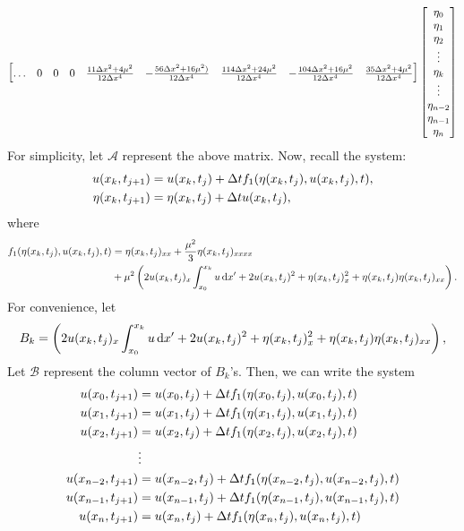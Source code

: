 \documentclass[10pt,reqno,oneside,a4paper]{article}
\begin{document}
\begin{align*}
\begin{bmatrix}
\ldots & 0 & 0 & 0 & \frac{11\Delta x^2 + 4 \mu^2}{12\Delta x^4} & - \frac{56 \Delta x^2 +16\mu^2)}{12\Delta x^4} & \frac{114\Delta x^2 + 24 \mu^2}{12\Delta x^4} &- \frac{104\Delta x^2 +16 \mu^2}{12\Delta x^4} & \frac{35 \Delta x^2 + 4\mu^2}{12\Delta x^4} 
\end{bmatrix}
\begin{bmatrix}
\eta_0 \\
\eta_1 \\
\eta_2 \\
\vdots \\
\eta_k \\
\vdots \\
\eta_{n-2} \\
\eta_{n-1} \\
\eta_{n}
\end{bmatrix}
\end{align*}
For simplicity, let $\mathcal{A}$ represent the above matrix. Now, recall the system:
\begin{align*}
u(x_k, t_{j+1}) &= u(x_k, t_j) + \Delta t f_1(\eta(x_k, t_j), u(x_k, t_j), t), \\
\eta(x_k, t_{j+1}) &=  \eta(x_k, t_j)+ \Delta t u(x_k, t_j),
\end{align*}
where 
\begin{align*}
f_1(\eta(x_k, t_j), u(x_k, t_j), t) &= \eta(x_k, t_j)_{xx} + \frac{\mu^2}{3} \eta(x_k, t_j)_{xxxx} \\
&+ \mu^2 \left( 2 u(x_k, t_j)_{x} \int^{x_k}_{x_0} u \,\mathrm{d} x' +2 u(x_k, t_j)^2 + \eta(x_k, t_j)^2_x + \eta(x_k, t_j)\eta(x_k, t_j)_{xx} \right).
\end{align*}
For convenience, let 
\[ B_k = \left( 2 u(x_k, t_j)_{x} \int^{x_k}_{x_0} u \,\mathrm{d} x' +2 u(x_k, t_j)^2 + \eta(x_k, t_j)^2_x + \eta(x_k, t_j)\eta(x_k, t_j)_{xx} \right), 
\]
Let $\mathcal{B}$ represent the column vector of $B_k$'s. Then, we can write the system 
\begin{align*}
u(x_0, t_{j+1}) &= u(x_0, t_j) + \Delta t f_1(\eta(x_0, t_j), u(x_0, t_j), t) \\
u(x_1, t_{j+1}) &= u(x_1, t_j) + \Delta t f_1(\eta(x_1, t_j), u(x_1, t_j), t) \\
u(x_2, t_{j+1}) &= u(x_2, t_j) + \Delta t f_1(\eta(x_2, t_j), u(x_2, t_j), t) \\
&\vdots \\
u(x_{n-2}, t_{j+1}) &= u(x_{n-2}, t_j) + \Delta t f_1(\eta(x_{n-2}, t_j), u(x_{n-2}, t_j), t) \\
u(x_{n-1}, t_{j+1}) &= u(x_{n-1}, t_j) + \Delta t f_1(\eta(x_{n-1}, t_j), u(x_{n-1}, t_j), t) \\
u(x_n, t_{j+1}) &= u(x_n, t_j) + \Delta t f_1(\eta(x_n, t_j), u(x_n, t_j), t) \\
\end{align*}
\end{document}
